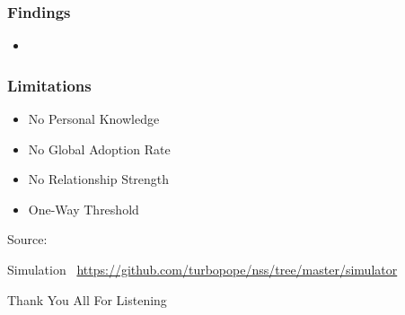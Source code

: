 \documentclass[slidestop,usenames,dvipsnames]{beamer}
\newcommand{\fitem}{\pause\vfill\item}
\newcommand{\source}[1]{\vfill\hfill Source: \cite{#1}}
\begin{document}


\begin{frame}
    \frametitle{Findings}
    \begin{itemize}
        \fitem
    \end{itemize}
    \vfill
\end{frame}

\begin{frame}
    \frametitle{Limitations}
    \begin{itemize}
        \fitem No Personal Knowledge
        \fitem No Global Adoption Rate
        \fitem No Relationship Strength
        \fitem One-Way Threshold
    \end{itemize}
    \source{watts2002simple}
    \vfill
\end{frame}

\begin{frame}
    \vfill
    \begin{center}
        {\Huge Simulation}\
        \vfill
        \url{https://github.com/turbopope/nss/tree/master/simulator}
    \end{center}
\end{frame}




\begin{frame}
    \vfill
    \begin{center}
        {\Huge Thank You All For Listening}\
    \end{center}
\end{frame}



\end{document}
